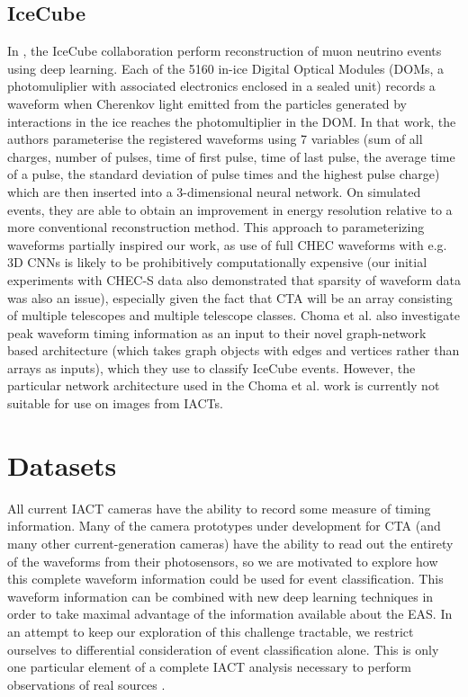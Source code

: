 \subsection{IceCube}
In \cite{icecube1}, the IceCube collaboration perform reconstruction of muon neutrino events using deep learning. Each of the 5160 in-ice Digital Optical Modules (DOMs, a photomuliplier with associated electronics enclosed in a sealed unit) records a waveform when Cherenkov light emitted from the particles generated by interactions in the ice reaches the photomultiplier in the DOM. In that work, the authors parameterise the registered waveforms using 7 variables (sum of all charges, number of pulses, time of first pulse, time of last pulse, the average time of a pulse, the standard deviation of pulse times and the highest pulse charge) which are then inserted into a 3-dimensional neural network. On simulated events, they are able to obtain an improvement in energy resolution relative to a more conventional reconstruction method. This approach to parameterizing waveforms partially inspired our work, as use of full CHEC waveforms with e.g. 3D CNNs is likely to be prohibitively computationally expensive (our initial experiments with CHEC-S data also demonstrated that sparsity of waveform data was also an issue), especially given the fact that CTA will be an array consisting of multiple telescopes and multiple telescope classes. Choma et al. \cite{icecubegraph} also investigate peak waveform timing information as an input to their novel graph-network based architecture (which takes graph objects with edges and vertices rather than arrays as inputs), which they use to classify IceCube events. However, the particular network architecture used in the Choma et al. work is currently not suitable for use on images from IACTs.

\section{Datasets} 
\label{Datasets}

All current IACT cameras have the ability to record some measure of timing information. Many of the camera prototypes under development for CTA (and many other current-generation cameras) have the ability to read out the entirety of the waveforms from their photosensors, so we are motivated to explore how this complete waveform information could be used for event classification. This waveform information can be combined with new deep learning techniques in order to take maximal advantage of the information available about the EAS. In an attempt to keep our exploration of this challenge tractable, we restrict ourselves to differential consideration of event classification alone. This is only one particular element of a complete IACT analysis necessary to perform observations of real sources \cite{Berge07,LiMa}.

